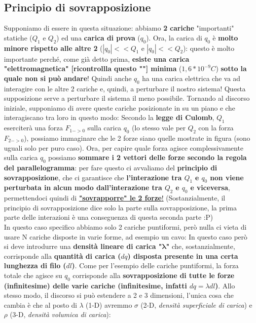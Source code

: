     \subsection{Principio di sovrapposizione}
        Supponiamo di essere in questa situazione: abbiamo \textbf{2 cariche} "importanti" statiche ($Q_1$ e $Q_2$) ed una \textbf{carica di prova} ($q_0$). Ora, la carica di $q_0$ è \textbf{molto minore rispetto alle altre 2} ($|q_0|<<Q_1$ e $|q_0|<<Q_2$): questo è molto importante perché, come già detto prima, \textbf{esiste una carica "elettromagnetica" [ricontrollla questo ""] minima} ($1,6*10^{-9}C$) \textbf{sotto la quale non si può andare}! Quindi anche $q_0$ ha una carica elettrica che va ad interagire con le altre 2 cariche e, quindi, a perturbare il nostro sistema! Questa supposizione serve a perturbare il sistema il meno possibile. Tornando al discorso iniziale, supponiamo di avere queste cariche posizionate in su un piano e che interagiscano tra loro in questo modo:
        Secondo la \textbf{legge di Culomb}, $Q_1$ eserciterà una forza $F_{1->0}$ sulla carica $q_0$ (lo stesso vale per $Q_2$ con la forza $F_{2->0}$), possiamo immaginare che le 2 forze siano quelle mostrate in figura (sono uguali solo per puro caso). Ora, per capire quale forza agisce complessivamente sulla carica $q_0$ possiamo \textbf{sommare i 2 vettori delle forze secondo la regola del parallelogramma}: per fare questo ci avvaliamo del \textbf{principio di sovrapposizione}, che ci garantisce che \textbf{l'interazione tra $Q_1$ e $q_0$ non viene perturbata in alcun modo dall'interazione tra $Q_2$ e $q_0$ e viceversa}, permettendoci quindi di \underline{\textbf{"sovrapporre" le 2 forze}!} (Sostanzialmente, il principio di sovrapposizione dice solo la parte sulla sovrapposizione, la prima parte delle interazioni è una conseguenza di questa seconda parte :P) \bigskip\\
        In questo caso specifico abbiamo solo 2 cariche puntiformi, però nulla ci vieta di usare N cariche disposte in varie forme, ad esempio un cavo:
        In questo caso però si deve introdurre una \textbf{densità lineare di carica "$\mathbf{\lambda}$"} che, sostanzialmente, corrisponde alla \textbf{quantità di carica ($dq$) disposta presente in una certa lunghezza di filo ($dl$)}. Come per l'esempio delle cariche puntiformi, la forza totale che agisce su $q_0$ corrisponde alla \textbf{sovrapposizione di tutte le forze (infinitesime) delle varie cariche (infinitesime, infatti $dq = \lambda dl$)}. Allo stesso modo, il discorso si può estendere a 2 e 3 dimensioni, l'unica cosa che cambia è che al posto di $\lambda$ (1-D) avremmo $\sigma$ (2-D, \textit{densità superficiale di carica}) e $\rho$ (3-D, \textit{densità volumica di carica}):

